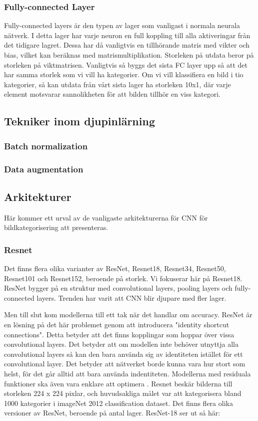 \documentclass[]{kththesis}
\begin{document}
\subsubsection{Fully-connected Layer}
Fully-connected layers är den typen av lager som vanligast i normala neurala nätverk. I detta lager har varje neuron en full koppling till alla aktiveringar från det tidigare lagret. Dessa har då vanligtvis en tillhörande matris med vikter och bias, vilket kan beräknas med matrismultiplikation. Storleken på utdata beror på storleken på viktmatrisen. Vanligtvis så byggs det sista FC layer upp så att det har samma storlek som vi vill ha kategorier. Om vi vill klassifiera en bild i tio kategorier, så kan utdata från vårt sista lager ha storleken 10x1, där varje element motsvarar sannolikheten för att bilden tillhör en viss kategori.

\subsection{Tekniker inom djupinlärning}

\subsubsection{Batch normalization}

\subsubsection{Data augmentation}

\subsection{Arkitekturer}
Här kommer ett urval av de vanligaste arkitekturerna för CNN för bildkategorisering att presenteras.

\subsubsection{Resnet}
Det finns flera olika varianter av ResNet, Resnet18, Resnet34, Resnet50, Resnet101 och Resnet152, beroende på storlek. Vi fokuserar här på Resnet18. ResNet bygger på en struktur med convolutional layers, pooling layers och fully-connected layers. Trenden har varit att CNN blir djupare med fler lager.

Men till slut kom modellerna till ett tak när det handlar om accuracy. ResNet är en lösning på det här problemet genom att introducera "identity shortcut connections". Detta betyder att det finns kopplingar som hoppar över vissa convolutional layers. Det betyder att om modellen inte behöver utnyttja alla convolutional layers så kan den bara använda sig av identiteten istället för ett convolutional layer. Det betyder att nätverket borde kunna vara hur stort som helst, för det går alltid att bara använda indentiteten. Modellerna med residuala funktioner ska även vara enklare att optimera \parencite{he2016deep}. Resnet beskär bilderna till storleken 224 x 224 pixlar, och huvudsakliga målet var att kategorisera bland 1000 kategorier i imageNet 2012 classification dataset. Det finns flera olika versioner av ResNet, beroende på antal lager. ResNet-18 ser ut så här:
\end{document}
